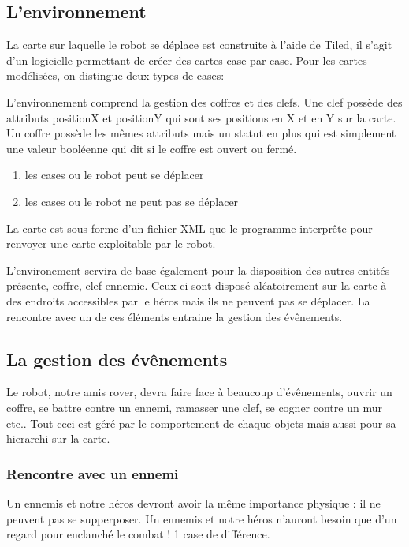 \documentclass[a4paper 12pts]{article}
\begin{document}
\subsection{L'environnement}
La carte sur laquelle le robot se déplace est construite à l'aide de Tiled, il s'agit d'un logicielle permettant de créer des cartes case par case. 
Pour les cartes modélisées, on distingue deux types de cases:

L'environnement comprend la gestion des coffres et des clefs.
Une clef possède des attributs positionX et positionY qui sont ses positions en X et en Y sur la carte. 
Un coffre possède les mêmes attributs mais un statut en plus qui est simplement une valeur booléenne qui dit si le coffre est ouvert ou fermé.


\begin{enumerate}
	\item les cases ou le robot peut se déplacer
	\item les cases ou le robot ne peut pas se déplacer
\end{enumerate}

La carte est sous forme d'un fichier XML que le programme interprête pour renvoyer une carte exploitable par le robot.

L'environement servira de base également pour la disposition des autres entités présente, coffre, clef ennemie.
Ceux ci sont disposé aléatoirement sur la carte à des endroits accessibles par le héros mais ils ne peuvent pas se déplacer.
La rencontre avec un de ces éléments entraine la gestion des évênements.





\subsection{La gestion des évênements}

Le robot, notre amis rover, devra faire face à beaucoup d'évênements, ouvrir un coffre, se battre contre un ennemi, ramasser une clef, se cogner contre un mur etc..
Tout ceci est géré par le comportement de chaque objets mais aussi pour sa hierarchi sur la carte.

\subsubsection {Rencontre avec un ennemi} 
Un ennemis et notre héros devront avoir la même importance physique : il ne peuvent pas se supperposer.
Un ennemis et notre héros n'auront besoin que d'un regard pour enclanché le combat ! 1 case de différence.
\end{document}
